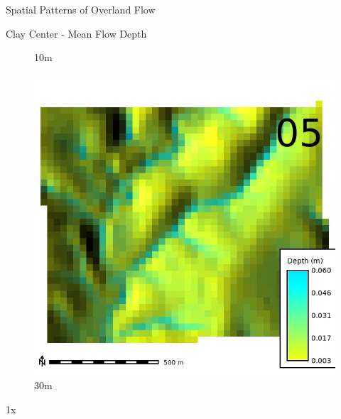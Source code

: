 \documentclass[
  ignorenonframetext,
]{beamer}
\begin{document}
\begin{frame}{Spatial Patterns of Overland Flow}
\begin{block}{Clay Center - Mean Flow Depth}
\begin{figure}[H]
{}

\caption{10m}

\end{figure}%

\begin{figure}[H]

{\centering \includegraphics{../output/clay-center/sensitivity_1/clay-center_depth_30_025_s_average.webp}

}

\caption{30m}

\end{figure}%

1x

\begin{figure}[H]


\end{figure}
\end{block}
\end{frame}
\end{document}
